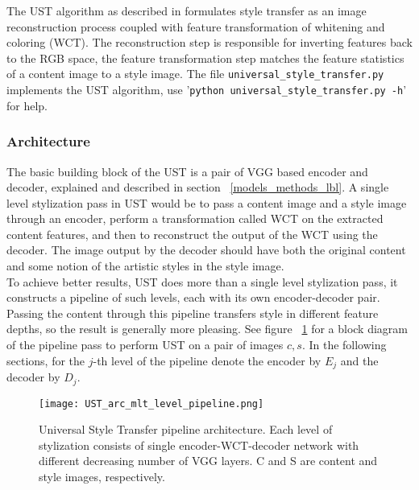 The UST algorithm as described in \cite{bib11} formulates style transfer as an image reconstruction process coupled with feature transformation of whitening and coloring (WCT). The reconstruction step is responsible for inverting features back to the RGB space, the feature transformation step matches the feature statistics of a content image to a style image. The file \texttt{universal\_style\_transfer.py} implements the UST algorithm, use '\texttt{python universal\_style\_transfer.py -h}' for help.

\subsubsection{Architecture}\label{subsec:arch}
The basic building block of the UST is a pair of VGG based encoder and decoder, explained and described in section ~\ref{models_methods_lbl}. A single level stylization pass in UST would be to pass a content image and a style image through an encoder, perform a transformation called WCT on the extracted content features, and then to reconstruct the output of the WCT using the decoder. The image output by the decoder should have both the original content and some notion of the artistic styles in the style image.\\ To achieve better results, UST does more than a single level stylization pass, it constructs a pipeline of such levels, each with its own encoder-decoder pair. Passing the content through this pipeline transfers style in different feature depths, so the result is generally more pleasing. See figure ~\ref{fig:full-pipeline} for a block diagram of the pipeline pass to perform UST on a pair of images $c,s$. In the following sections, for the $j$-th level of the pipeline denote the encoder by $E_j$ and the decoder by $D_j$.

\begin{figure}[h!]
	\centering
	\texttt{[image: UST\_arc\_mlt\_level\_pipeline.png]}
	\caption{Universal Style Transfer pipeline architecture. Each level of stylization consists of single encoder-WCT-decoder network with different decreasing number of VGG layers. C and S are content and style images, respectively.
	}
	\label{fig:full-pipeline}
\end{figure}

